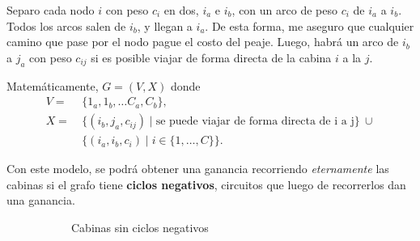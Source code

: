 \documentclass[12pt, a4paper]{report}
\theoremstyle{definition} %
\begin{document}
\begin{enumerate}[a)]
Separo cada nodo $i$ con peso $c_i$ en dos, $i_a$ e $i_b$, con un arco de peso $c_i$ de $i_a$ a $i_b$. Todos los arcos salen de $i_b$, y llegan a $i_a$. De esta forma, me aseguro que cualquier camino que pase por el nodo pague el costo del peaje. Luego, habrá un arco de $i_b$ a $j_a$ con peso $c_{ij}$ si es posible viajar de forma directa de la cabina $i$ a la $j$.

Matemáticamente, $G = (V, X)$ donde
\begin{align*}
    V = \ &\{ 1_a, 1_b, \ldots C_a, C_b\},\\
    X = \ &\{ (i_b, j_a, c_{ij}) \mid \text{se puede viajar de forma directa de i a j} \}\ \cup\\
      &\{ (i_a, i_b, c_i) \mid i \in \{1, \ldots, C\}\}.
\end{align*}

Con este modelo, se podrá obtener una ganancia recorriendo \textit{eternamente} las cabinas si el grafo tiene \textbf{ciclos negativos}, circuitos que luego de recorrerlos dan una ganancia.

\begin{figure}[H]
    \centering
    \begin{subfigure}[b]{0.4\textwidth}
        \centering
        \caption{Cabinas sin ciclos negativos}
        \label{5/ej/sin}
    \end{subfigure}
    \begin{subfigure}[b]{0.4\textwidth}
        \centering
\end{subfigure}
\end{figure}
\end{enumerate}
\end{document}
